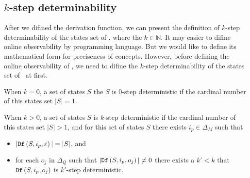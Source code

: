 \subsection{$k$-step determinability}
After we difined the derivation function, we can present the definition of $k$-step determinability of the states set of \BCNs, where the $k\in \mathbb{N}$. It may easier to difine online observability by programming language. But we would like to define its mathematical form for preciseness of concepts. However, before defining the online observability of \BCNs, we need to difine the $k$-step determinability of the states set of \BCNs\ at first.
\begin{definition} 

When $k=0$, a set of states $S$ the $S$ is $0$-step deterministic if the cardinal number of this states set $|S|=1$. 

When $k>0$, a set of states $S$ is $k$-step deterministic
 if the cardinal number of this states set $|S|>1$, and for this set of states $S$ there exists $i_p \in \Delta_M$ such that
 \begin{itemize}
 \item  $|{\tt Df}\left(S,i_p,\varepsilon\right)|=|S|$, and 
 \item  for each $o_j$ in $\Delta_Q$ such that $|{\tt Df}\left(S,i_p,o_j\right)|\neq 0$ there exists a ${k'}<k$ that ${\tt Df}\left(S,i_p,o_j\right)$ is $k'$-step deterministic.
 \end{itemize}
\end{definition}

